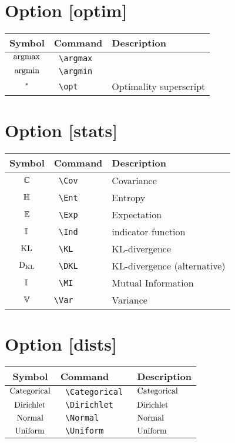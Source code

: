 \documentclass{article}
\begin{document}
\section*{Option [optim]}

\begin{tabular}{cll}
  Symbol & Command & Description \\
  \hline
  $\operatorname*{argmax}$ & \texttt{ \textbackslash argmax } & \\
  $\operatorname*{argmin}$ & \texttt{ \textbackslash argmin } & \\
  $^{*}$ & \texttt{ \textbackslash opt } & Optimality superscript \\
\end{tabular}

\section*{Option [stats]}

\begin{tabular}{cll}
  Symbol & Command & Description \\
  \hline
  $\operatorname*{\mathbb{C}}$ & \texttt{ \textbackslash Cov } & Covariance \\
  $\operatorname*{\mathbb{H}}$ & \texttt{ \textbackslash Ent } & Entropy \\
  $\operatorname*{\mathbb{E}}$ & \texttt{ \textbackslash Exp } & Expectation \\
  $\operatorname*{\mathbb{I}}$ & \texttt{ \textbackslash Ind } & indicator function \\
  $\operatorname*{\operatorname{KL}}$ & \texttt{ \textbackslash KL } & KL-divergence \\
  $\operatorname*{{D_\text{KL}}}$ & \texttt{ \textbackslash DKL } & KL-divergence (alternative) \\
  $\operatorname*{\mathbb{I}}$ & \texttt{ \textbackslash MI } & Mutual Information \\
  $\operatorname*{\mathbb{V}}$ & \texttt{\textbackslash Var} & Variance \\
\end{tabular}

\section*{Option [dists]}

\begin{tabular}{cll}
  Symbol & Command & Description \\
  \hline
  $\operatorname{Categorical}$ & \texttt{ \textbackslash Categorical } & $\operatorname{Categorical}$ \\
  $\operatorname{Dirichlet}$ & \texttt{ \textbackslash Dirichlet } & $\operatorname{Dirichlet}$ \\
  $\operatorname{Normal}$ & \texttt{ \textbackslash Normal } & $\operatorname{Normal}$ \\
  $\operatorname{Uniform}$ & \texttt{ \textbackslash Uniform } & $\operatorname{Uniform}$ \\
\end{tabular}
\end{document}

